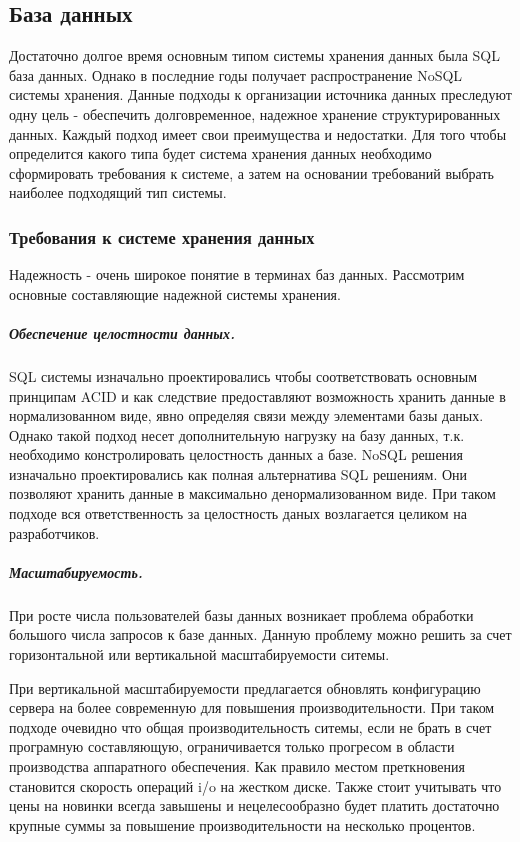 \subsection{База данных}
Достаточно долгое время основным типом системы хранения данных была SQL база
данных. Однако в последние годы получает распространение NoSQL системы хранения.
Данные подходы к организации источника данных преследуют одну цель - обеспечить
долговременное, надежное хранение структурированных данных. Каждый подход имеет
свои преимущества и недостатки.
Для того чтобы определится какого типа будет система хранения данных необходимо
сформировать требования к системе, а затем на основании требований выбрать
наиболее подходящий тип системы.

\subsubsection{Требования к системе хранения данных}
Надежность - очень широкое понятие в терминах баз данных. Рассмотрим основные
составляющие надежной системы хранения.
\subparagraph{Обеспечение целостности данных.}
SQL системы изначально проектировались чтобы соответствовать основным принципам
ACID и как следствие предоставляют возможность хранить данные в нормализованном
виде, явно определяя связи между элементами базы даных. Однако такой подход
несет дополнительную нагрузку на базу данных, т.к. необходимо констролировать
целостность данных а базе.
NoSQL решения изначально проектировались как полная альтернатива SQL решениям.
Они позволяют хранить данные в максимально денормализованном виде. При таком
подходе вся ответственность за целостность даных возлагается целиком на
разработчиков.
\subparagraph{Масштабируемость.} 
При росте числа пользователей базы данных возникает проблема обработки большого
числа запросов к базе данных. Данную проблему можно решить за счет
горизонтальной или вертикальной масштабируемости ситемы.

При вертикальной масштабируемости предлагается обновлять конфигурацию сервера на
более современную для повышения производительности. При таком подходе очевидно
что общая производительность ситемы, если не брать в счет програмную
составляющую, ограничивается только прогресом в области производства аппаратного
обеспечения. Как правило местом преткновения становится скорость операций i/o на
жестком диске. Также стоит учитывать что цены на новинки всегда завышены и
нецелесообразно будет платить достаточно крупные суммы за повышение
производительности на несколько процентов.


